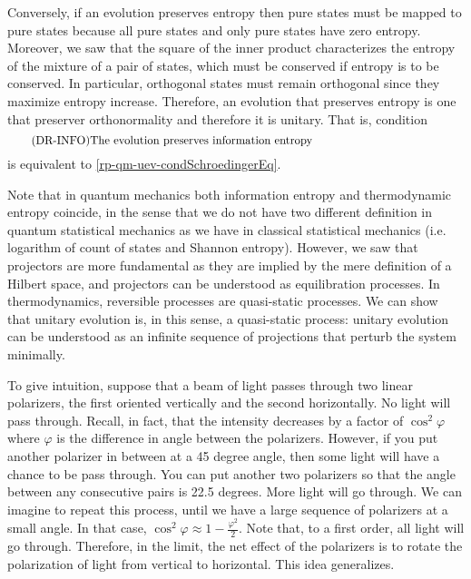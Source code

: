 Conversely, if an evolution preserves entropy then pure states must be mapped to pure states because all pure states and only pure states have zero entropy. Moreover, we saw that the square of the inner product characterizes the entropy of the mixture of a pair of states, which must be conserved if entropy is to be conserved. In particular, orthogonal states must remain orthogonal since they maximize entropy increase. Therefore, an evolution that preserves entropy is one that preserver orthonormality and therefore it is unitary. That is, condition
\begin{equation}\label{rp-qm-uev-condInfoEntropy}
	\tag{DR-INFO}
	\eqtext{The evolution preserves information entropy} 
\end{equation}
is equivalent to \ref{rp-qm-uev-condSchroedingerEq}.

Note that in quantum mechanics both information entropy and thermodynamic entropy coincide, in the sense that we do not have two different definition in quantum statistical mechanics as we have in classical statistical mechanics (i.e. logarithm of count of states and Shannon entropy). However, we saw that projectors are more fundamental as they are implied by the mere definition of a Hilbert space, and projectors can be understood as equilibration processes. In thermodynamics, reversible processes are quasi-static processes. We can show that unitary evolution is, in this sense, a quasi-static process: unitary evolution can be understood as an infinite sequence of projections that perturb the system minimally.

To give intuition, suppose that a beam of light passes through two linear polarizers, the first oriented vertically and the second horizontally. No light will pass through. Recall, in fact, that the intensity decreases by a factor of $\cos^2 \varphi$ where $\varphi$ is the difference in angle between the polarizers. However, if you put another polarizer in between at a 45 degree angle, then some light will have a chance to be pass through. You can put another two polarizers so that the angle between any consecutive pairs is 22.5 degrees. More light will go through. We can imagine to repeat this process, until we have a large sequence of polarizers at a small angle. In that case, $\cos^2 \varphi \approx 1 - \frac{\varphi^2}{2}$. Note that, to a first order, all light will go through. Therefore, in the limit, the net effect of the polarizers is to rotate the polarization of light from vertical to horizontal. This idea generalizes.

